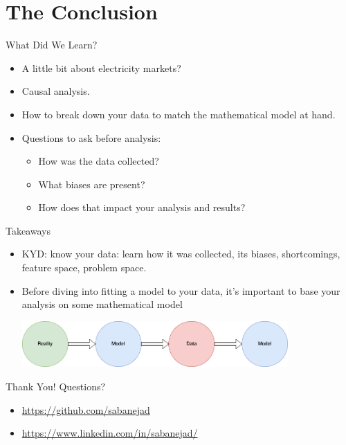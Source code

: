 \documentclass{beamer}
\begin{document}
\section{The Conclusion}

\begin{frame}{What Did We Learn?}
  \begin{itemize}
    \item<+-> A little bit about electricity markets?
    \item<+-> Causal analysis.
    \item<+-> How to break down your data to match the mathematical model at hand.
    \item<+-> Questions to ask before analysis:
    \begin{itemize}
      \item<+-> How was the data collected? 
      \item<+-> What biases are present?
      \item<+-> How does that impact your analysis and results?
    \end{itemize}
  \end{itemize}
\end{frame}

\begin{frame}{Takeaways}
  \begin{itemize}
    \item<+-> KYD: know your data: learn how it was collected, its biases, shortcomings, feature space, problem space.
    \item<+-> Before diving into fitting a model to your data, it's important to base your analysis on some mathematical model
    \vspace{1cm}
    \begin{center}
    \includegraphics[width=0.8\textwidth]{images/reality-model-data.png}
    \end{center}
  \end{itemize}
\end{frame}

\begin{frame}{Thank You! Questions?}
  \begin{itemize}
  \item \url{https://github.com/sabanejad}
  \item \url{https://www.linkedin.com/in/sabanejad/}
  \end{itemize}
\end{frame}
\end{document}

